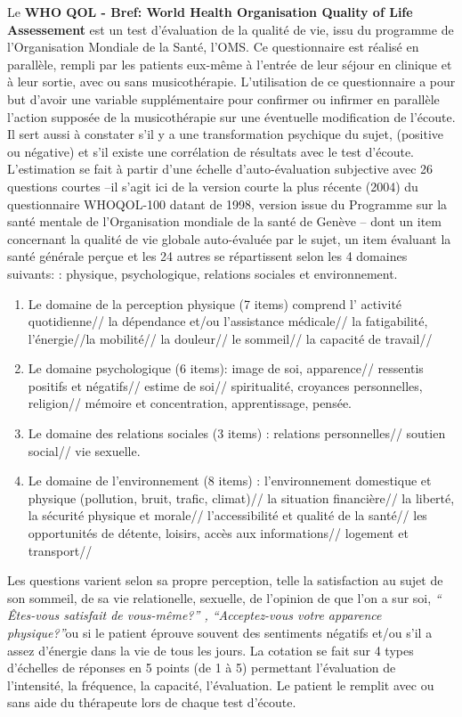         Le\textbf{ WHO QOL  - Bref:  World Health
   Organisation Quality of Life Assessement } est un test d'évaluation de la qualité de vie, issu du
	programme de l'Organisation Mondiale de la Santé, l'OMS.
	Ce questionnaire est réalisé en parallèle, rempli par
        les patients eux-même à l'entrée de leur séjour en clinique et
        à leur sortie, avec ou sans musicothérapie.
 L'utilisation de ce questionnaire a pour but d'avoir
 une variable supplémentaire pour confirmer ou infirmer en
parallèle l'action supposée  de la musicothérapie sur une éventuelle
modification de l'écoute. Il sert aussi à constater s'il y a une transformation psychique du sujet,
 (positive ou négative) et s'il existe une corrélation de
 résultats avec le test d'écoute.
        L'estimation se fait à partir d'une échelle
d'auto-évaluation subjective avec 26 questions courtes 
--il s'agit ici de la version courte  la plus récente (2004) du questionnaire
 WHOQOL-100 datant de 1998, version issue du Programme sur la santé
 mentale de l'Organisation mondiale de la santé de Genève --
dont un item concernant la qualité de vie globale
auto-évaluée par le sujet, un item évaluant la santé générale perçue
et les 24 autres se répartissent selon les 4 domaines suivants:  
: physique, psychologique, relations sociales et environnement.
\begin{enumerate}
\item  Le domaine de la perception physique (7 items) comprend l' activité quotidienne// la dépendance et/ou l'assistance médicale// la fatigabilité, l'énergie//la mobilité// la douleur// le sommeil// la capacité de travail//
	\item Le domaine psychologique (6 items):  image de soi, apparence// ressentis positifs et négatifs// estime de soi// spiritualité, croyances personnelles, religion// mémoire et concentration, apprentissage, pensée.
		\item Le domaine des relations sociales (3 items) : relations personnelles// soutien social// vie sexuelle.
			\item Le domaine de l'environnement (8 items) :
                         l'environnement domestique et physique
                         (pollution, bruit, trafic, climat)// la
                         situation financière//  la liberté, la
                         sécurité physique et morale//
                         l'accessibilité et qualité de la santé// les
                         opportunités de détente, loisirs, accès aux
                         informations// logement et transport// 
\end{enumerate}
		Les questions varient selon sa propre perception, telle la satisfaction
au sujet de son  sommeil, de sa vie relationelle, sexuelle, de
l'opinion de que l'on a sur soi,  \textit{`` Êtes-vous satisfait de
vous-même?'' , ``Acceptez-vous votre apparence physique?''}ou si le patient éprouve souvent des sentiments négatifs
et/ou s'il a assez d'énergie dans la vie de tous les jours.
La cotation se fait sur 4 types d'échelles de réponses en 5 points (de 1 à 5)
permettant l'évaluation de l'intensité, la fréquence, la capacité, l'évaluation.
Le patient le remplit avec ou sans aide du
thérapeute lors de chaque test
d'écoute. 

